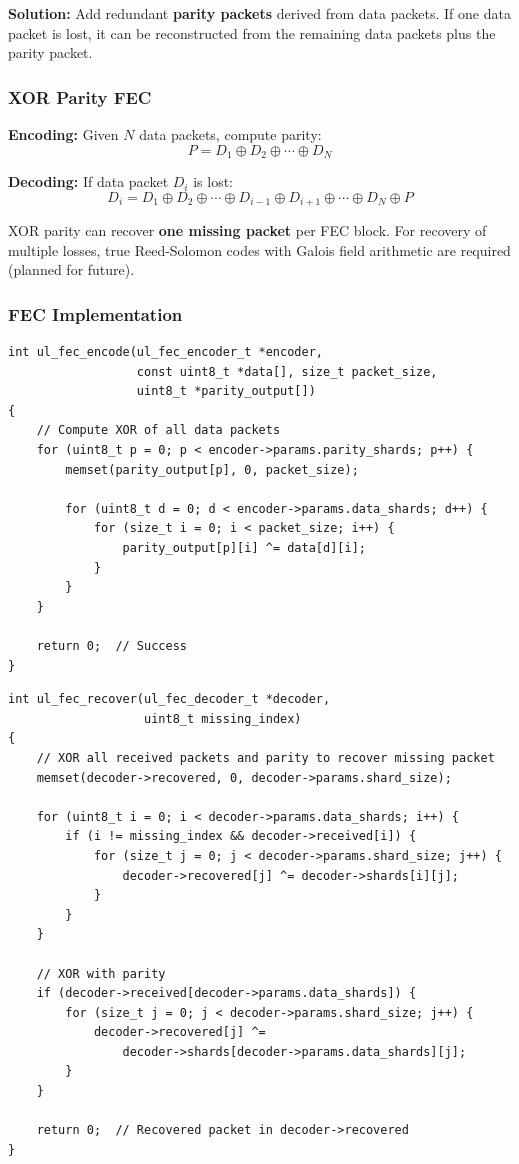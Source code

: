 \documentclass[11pt,a4paper]{article}
\begin{document}
\textbf{Solution:} Add redundant \textbf{parity packets} derived from data packets. If one data packet is lost, it can be reconstructed from the remaining data packets plus the parity packet.

\subsubsection{XOR Parity FEC}

\textbf{Encoding:} Given $N$ data packets, compute parity:
$$P = D_1 \oplus D_2 \oplus \cdots \oplus D_N$$

\textbf{Decoding:} If data packet $D_i$ is lost:
$$D_i = D_1 \oplus D_2 \oplus \cdots \oplus D_{i-1} \oplus D_{i+1} \oplus \cdots \oplus D_N \oplus P$$

\begin{notebox}
XOR parity can recover \textbf{one missing packet} per FEC block. For recovery of multiple losses, true Reed-Solomon codes with Galois field arithmetic are required (planned for future).
\end{notebox}

\subsubsection{FEC Implementation}

\begin{lstlisting}[caption={XOR Parity FEC Encoder}]
int ul_fec_encode(ul_fec_encoder_t *encoder,
                  const uint8_t *data[], size_t packet_size,
                  uint8_t *parity_output[])
{
    // Compute XOR of all data packets
    for (uint8_t p = 0; p < encoder->params.parity_shards; p++) {
        memset(parity_output[p], 0, packet_size);

        for (uint8_t d = 0; d < encoder->params.data_shards; d++) {
            for (size_t i = 0; i < packet_size; i++) {
                parity_output[p][i] ^= data[d][i];
            }
        }
    }

    return 0;  // Success
}
\end{lstlisting}

\begin{lstlisting}[caption={FEC Packet Loss Recovery}]
int ul_fec_recover(ul_fec_decoder_t *decoder,
                   uint8_t missing_index)
{
    // XOR all received packets and parity to recover missing packet
    memset(decoder->recovered, 0, decoder->params.shard_size);

    for (uint8_t i = 0; i < decoder->params.data_shards; i++) {
        if (i != missing_index && decoder->received[i]) {
            for (size_t j = 0; j < decoder->params.shard_size; j++) {
                decoder->recovered[j] ^= decoder->shards[i][j];
            }
        }
    }

    // XOR with parity
    if (decoder->received[decoder->params.data_shards]) {
        for (size_t j = 0; j < decoder->params.shard_size; j++) {
            decoder->recovered[j] ^= 
                decoder->shards[decoder->params.data_shards][j];
        }
    }

    return 0;  // Recovered packet in decoder->recovered
}
\end{lstlisting}
\end{document}

